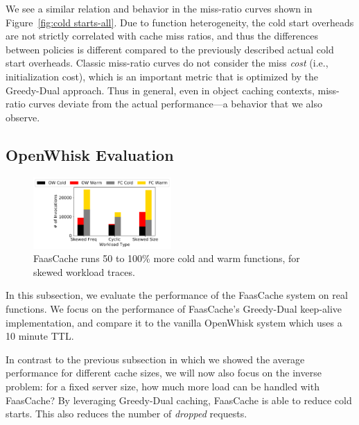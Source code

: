 

We see a similar relation and behavior in the miss-ratio curves shown in Figure~\ref{fig:cold starts-all}. 
Due to function heterogeneity, the cold start overheads are not strictly correlated with cache miss ratios, and thus the differences between policies is different compared to the previously described actual cold start overheads. 
Classic miss-ratio curves do not consider the miss \emph{cost} (i.e., initialization cost), which is an important metric that is optimized by the Greedy-Dual approach.
Thus in general, even in object caching contexts, miss-ratio curves deviate from the actual performance---a behavior that we also observe. 

\subsection{OpenWhisk Evaluation}
\label{subsec:ow-eval}
\vspace*{\subsecspace}


\begin{figure}
  \centering
  \includegraphics[width=0.47\textwidth]{../graphs/litmus_tests/litmus_2_stacked.pdf}
  \caption{FaasCache runs 50 to 100\% more cold and warm functions, for skewed workload traces.}
  \label{fig:litmus_2}  
\end{figure}


In this subsection, we evaluate the performance of the FaasCache system on real functions. 
We focus on the performance of FaasCache's Greedy-Dual keep-alive implementation, and compare it to the vanilla OpenWhisk system which uses a 10 minute TTL.


In contrast to the previous subsection in which we showed the average performance for different cache sizes, we will now also focus on the inverse problem: for a fixed server size, how much more load can be handled with FaasCache? 
By leveraging Greedy-Dual caching, FaasCache is able to reduce cold starts. 
This also reduces the number of \emph{dropped} requests. %

